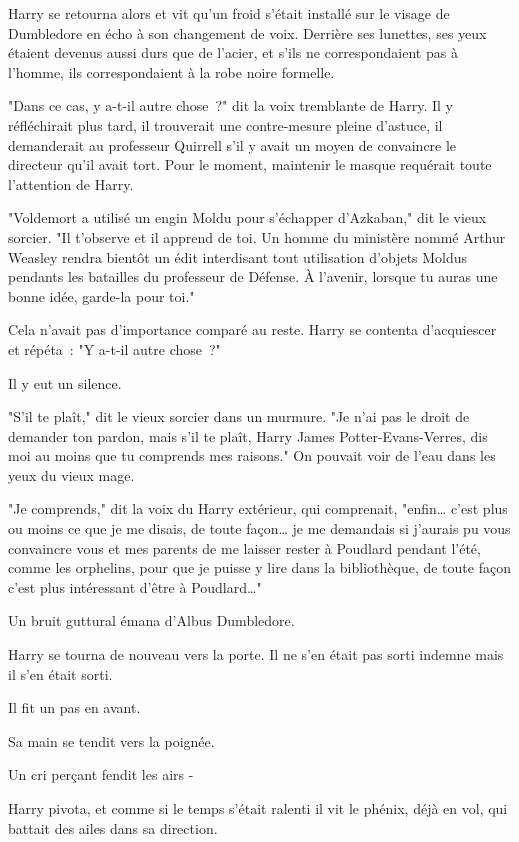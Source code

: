 Harry se retourna alors et vit qu'un froid s'était installé sur le visage de Dumbledore en écho à son changement de voix. Derrière ses lunettes, ses yeux étaient devenus aussi durs que de l'acier, et s'ils ne correspondaient pas à l'homme, ils correspondaient à la robe noire formelle.

"Dans ce cas, y a-t-il autre chose~?" dit la voix tremblante de Harry. Il y réfléchirait plus tard, il trouverait une contre-mesure pleine d'astuce, il demanderait au professeur Quirrell s'il y avait un moyen de convaincre le directeur qu'il avait tort. Pour le moment, maintenir le masque requérait toute l'attention de Harry.

"Voldemort a utilisé un engin Moldu pour s'échapper d'Azkaban," dit le vieux sorcier. "Il t'observe et il apprend de toi. Un homme du ministère nommé Arthur Weasley rendra bientôt un édit interdisant tout utilisation d'objets Moldus pendants les batailles du professeur de Défense. À l'avenir, lorsque tu auras une bonne idée, garde-la pour toi."

Cela n'avait pas d'importance comparé au reste. Harry se contenta d'acquiescer et répéta~: "Y a-t-il autre chose~?"

Il y eut un silence.

"S'il te plaît," dit le vieux sorcier dans un murmure. "Je n'ai pas le droit de demander ton pardon, mais s'il te plaît, Harry James Potter-Evans-Verres, dis moi au moins que tu comprends mes raisons." On pouvait voir de l'eau dans les yeux du vieux mage.

"Je comprends," dit la voix du Harry extérieur, qui comprenait, "enfin… c'est plus ou moins ce que je me disais, de toute façon… je me demandais si j'aurais pu vous convaincre vous et mes parents de me laisser rester à Poudlard pendant l'été, comme les orphelins, pour que je puisse y lire dans la bibliothèque, de toute façon c'est plus intéressant d'être à Poudlard…"

Un bruit guttural émana d'Albus Dumbledore.

Harry se tourna de nouveau vers la porte. Il ne s'en était pas sorti indemne mais il s'en était sorti.

Il fit un pas en avant.

Sa main se tendit vers la poignée.

Un cri perçant fendit les airs -

Harry pivota, et comme si le temps s'était ralenti il vit le phénix, déjà en vol, qui battait des ailes dans sa direction.

